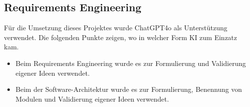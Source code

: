 \documentclass[a4paper,12pt]{article}
\begin{document}
\subsection*{Requirements Engineering}

Für die Umsetzung dieses Projektes wurde ChatGPT4o als Unterstützung verwendet. Die folgenden Punkte zeigen, wo in welcher Form KI zum Einzatz kam.

\begin{itemize}
    \item Beim Requirements Engineering wurde es zur Formulierung und Validierung eigener Ideen verwendet.
    \item Beim der Software-Architektur wurde es zur Formulierung, Benennung von Modulen und Validierung eigener Ideen verwendet.
\end{itemize}
\end{document}
